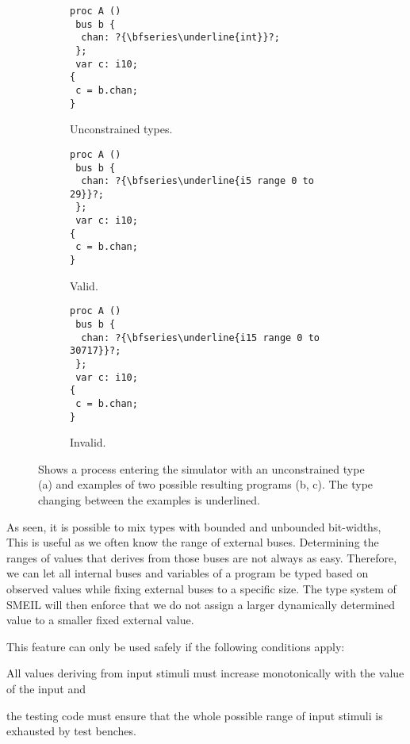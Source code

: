 \begin{figure}
  \centerfloat
  \begin{subfigure}[t]{0.20\paperwidth}
\begin{lstlisting}[language=smeil]
proc A ()
 bus b {
  chan: ?{\bfseries\underline{int}}?;
 };
 var c: i10;
{
 c = b.chan;
}
\end{lstlisting}
    \caption{Unconstrained types.}
  \end{subfigure}
  \begin{subfigure}[t]{0.20\paperwidth}
    \begin{lstlisting}[language=smeil]
proc A ()
 bus b {
  chan: ?{\bfseries\underline{i5 range 0 to 29}}?;
 };
 var c: i10;
{
 c = b.chan;
}
    \end{lstlisting}
    \caption{Valid.}
  \end{subfigure}
  \begin{subfigure}[t]{0.20\paperwidth}
    \begin{lstlisting}[language=smeil]
proc A ()
 bus b {
  chan: ?{\bfseries\underline{i15 range 0 to 30717}}?;
 };
 var c: i10;
{
 c = b.chan;
}
\end{lstlisting}
    \caption{Invalid.}
    \label{fig:violated}
  \end{subfigure}
  \caption{Shows a process entering the simulator with an unconstrained type (a)
    and examples of two possible resulting programs (b, c). The type changing
    between the examples is underlined.}
  \label{fig:simtyping}
\end{figure}

As seen, it is possible to mix types with bounded and unbounded bit-widths, This
is useful as we often know the range of external buses. Determining the
ranges of values that derives from those buses are not always as
easy. Therefore, we can let all internal buses and variables of a program be
typed based on observed values while fixing external buses to a specific
size. The type system of SMEIL will then enforce that we do not assign a larger
dynamically determined value to a smaller fixed external value.

This feature can only be used safely if the following conditions
apply: \begin{inparaenum}[1)] \item All values deriving from input stimuli must
  increase monotonically with the value of the input and \item the testing code
  must ensure that the whole possible range of input stimuli is exhausted by
  test benches.
\end{inparaenum}


